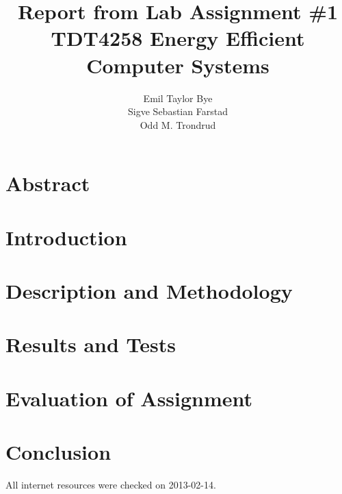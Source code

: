 \documentclass{article}
\begin{document}

\title{Report from Lab Assignment \#1\\TDT4258 Energy Efficient Computer Systems}

\author{Emil Taylor Bye\\Sigve Sebastian Farstad\\Odd M. Trondrud}


\maketitle


\bigskip
\bigskip
\bigskip
\bigskip

\part*{Abstract}



\newpage

\tableofcontents

\setcounter{secnumdepth}{3}

\newpage 

\setcounter{page}{1}

\part{Introduction}



\part{Description and Methodology}



\part{Results and Tests}



\part{Evaluation of Assignment}



\part{Conclusion}



\newpage

{}

\nocite{*}
All internet resources were checked on 2013-02-14.
\end{document}
